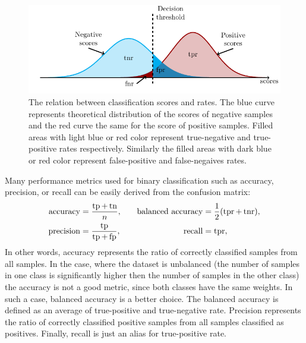 \begin{figure}
  \centering
  \includegraphics[width=\linewidth]{images/confusion_rates.pdf}
  \caption{The relation between classification scores and  rates. The blue curve represents theoretical distribution of the scores of negative samples and the red curve the same for the score of positive samples. Filled areas with light blue or red color represent true-negative and true-positive rates respectively. Similarly the filled areas with dark blue or red color represent false-positive and false-negaives rates.}
  \label{fig: scores and rates}
\end{figure}

Many performance metrics used for binary classification such as accuracy, precision, or recall can be easily derived from the confusion matrix:
\begin{equation}\label{eq: performance metrics}
  \begin{aligned}
    \accuracy & = \frac{\tp + \tn}{n}, & \quad
    \baccuracy & = \frac{1}{2}\Brac{\tpr + \tnr}, \\
    \precision & = \frac{\tp}{\tp + \fp}, & \quad
    \recall & = \tpr, \\
  \end{aligned}
\end{equation}
In other words, accuracy represents the ratio of correctly classified samples from all samples. In the case, where the dataset is unbalanced (the number of samples in one class is significantly higher then the number of samples in the other class) the accuracy is not a good metric, since both classes have the same weights. In such a case, balanced accuracy is a better choice. The balanced accuracy is defined as an average of true-positive and true-negative rate. Precision represents the ratio of correctly classified positive samples from all samples classified as positives. Finally, recall is just an alias for true-positive rate.
